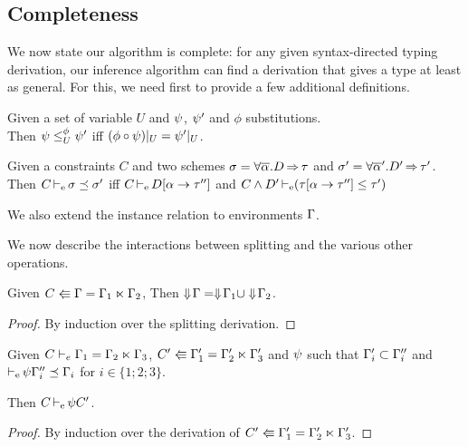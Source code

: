 \subsection{Completeness}

We now state our algorithm is complete: for any given
syntax-directed typing derivation, our inference algorithm can find
a derivation that gives a type at least as general.
For this, we need first to provide a few additional definitions.

\begin{definition}
  Given a set of variable $U$ and $\unif$, $\unif'$ and $\phi$
  substitutions. \\
  Then
  $\unif \leq^{\phi}_{U} \unif'$ iff $(\phi \circ \unif)|_{U} = \unif'|_U$.
\end{definition}

\begin{definition}
  Given a constraints $C$ and two schemes
  $\schm = \forall \Multi\tvar. \qual{D}{\tau}$ and
  $\schm' = \forall \Multi\tvar'. \qual{D'}{\tau'} $.
  Then $\entail{C}{\schm \preceq \schm'}$
  iff $\entail{C}{\subst{\tvar}{\tau''} D}$
  and $\entail{C\Cand D'}{\Cleq{\subst{\tvar}{\tau''}\tau}{\tau'}}$
\end{definition}

We also extend the instance relation to environments $\E$.


We now describe the interactions between splitting and the
various other operations.

\begin{lemma}
  \label{split:flat}
  Given $\bsplit{C}{\E}{\E_1}{\E_2}$, Then $\Eflat\E = \Eflat\E_1 \cup \Eflat\E_2$.
  \begin{proof}
    By induction over the splitting derivation.
  \end{proof}
\end{lemma}


\begin{lemma}
  \label{split:gen}
  Given $\lsplit{C}{\E_1}{\E_2}{\E_3}$,
  $\bsplit{C'}{\E'_1}{\E'_2}{\E'_3}$
  and $\unif$ such that
  $\E'_i\subset\E''_i$ and $\entail{}{\unif\E''_i \preceq \E_i}$
  for $i\in\{1;2;3\}$.

  Then $\entail{C}{\unif C'}$.
\begin{proof}
  By induction over the derivation of $\bsplit{C'}{\E'_1}{\E'_2}{\E'_3}$.
\end{proof}
\end{lemma}


